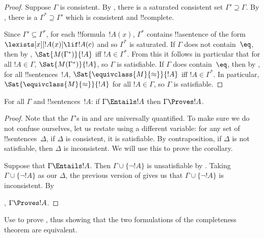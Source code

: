 \begin{proof}
Suppose $\Gamma$ is consistent. By
  , there is a saturated consistent set
  $\Gamma' \supseteq \Gamma$. By , there
is a $\Gamma^* \supseteq \Gamma'$ which is
consistent and !!{complete}.

  Since $\Gamma' \subseteq \Gamma^*$, for each
  !!{formula}~$!A(x)$, $\Gamma^*$ contains !!a{sentence} of the form
  $\lexists[x][!A(x)] \lif !A(c)$
  and so $\Gamma^*$ is saturated.  If $\Gamma$
  does not contain~$\eq$, then by
,
$\Sat{M(\Gamma^*)}{!A}$ iff $!A \in
\Gamma^*$.  From this it follows in particular that for all $!A \in
\Gamma$, $\Sat{M(\Gamma^*)}{!A}$, so
$\Gamma$ is satisfiable.
  If $\Gamma$ does contain~$\eq$,
  then by , for all !!{sentence}s~$!A$,
  $\Sat{\equivclass{M}{\approx}}{!A}$ iff $!A \in \Gamma^*$.  In
  particular, $\Sat{\equivclass{M}{\approx}}{!A}$ for all $!A \in
  \Gamma$, so $\Gamma$ is satisfiable.
\end{proof}

\begin{cor}
For all $\Gamma$ and !!{sentence}s~$!A$: if $\Gamma \Entails !A$ then
$\Gamma \Proves !A$.
\end{cor}

\begin{proof}
Note that the $\Gamma$'s in  and
 are universally quantified.  To make sure we
do not confuse ourselves, let us restate 
using a different variable: for any set of !!{sentence}s~$\Delta$, if
$\Delta$ is consistent, it is satisfiable.  By contraposition, if
$\Delta$ is not satisfiable, then $\Delta$ is inconsistent.  We will
use this to prove the corollary.

Suppose that $\Gamma \Entails !A$.  Then $\Gamma \cup \{\lnot !A\}$ is
unsatisfiable by .  Taking $\Gamma
\cup \{\lnot !A\}$ as our $\Delta$, the previous version of
 gives us that $\Gamma \cup \{\lnot !A\}$ is
inconsistent.  By

  ,
$\Gamma \Proves !A$.
\end{proof}


\begin{prob}
Use  to prove
, thus showing that the two
formulations of the completeness theorem are equivalent.
\end{prob}






